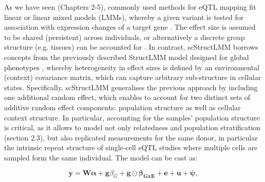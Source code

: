 As we have seen (Chapters 
2-5), commonly used methods for eQTL mapping fit linear or linear mixed models (LMMs),  whereby a given variant is tested for association with expression changes of a target gene \cite{kilpinen2017common}. 
The effect size is assumed to be shared (persistent) across individuals, or alternatively a discrete group structure (e.g. tissues) can be accounted for \cite{fusi2012joint}. 
In contrast, scStructLMM borrows concepts from the previously described StructLMM model designed for global phenotypes \cite{moore2019linear}, whereby heterogeneity in effect sizes is defined by an environmental (context) covariance matrix, which can capture arbitrary sub-structure in cellular states. 
Specifically, scStructLMM generalises the previous approach by including one additional random effect, which enables to  account for two distinct sets of additive random effect components: population structure as well as cellular context structure.
In particular, accounting for the samples' population structure is critical, as it allows to model not only relatedness and population stratification (section 
2.3), but also replicated measurements for the same donor, in particular the intrinsic repeat structure of single-cell eQTL studies where multiple cells are sampled form the same individual. 
The model can be cast as:

\begin{equation}\label{eq:scStructLMM}
 \mathbf{y} =  \mathbf{W}\boldsymbol{\alpha} + \mathbf{g}\beta_G + \mathbf{g} \odot \boldsymbol{\beta_{GxE}} + \mathbf{e} + \mathbf{u} + \boldsymbol{\psi}, 
\end{equation}


